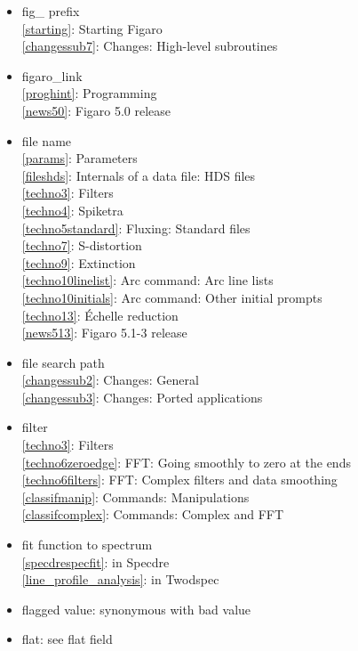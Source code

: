 \documentclass[11pt,twoside]{article}
\newcommand{\htmlref}[2]{#1}
\newcommand{\idxint}[2]{\ref{#1}: \htmlref{#2}{#1}}
\newcommand{\idxint}[2]{\htmlref{#2}{#1}}
\begin{document}
\begin{itemize}
\item fig\_ prefix\\
   \idxint{starting}{Starting Figaro}\\
   \idxint{changessub7}{Changes: High-level subroutines}
\item figaro\_link\\
   \idxint{proghint}{Programming}\\
   \idxint{news50}{Figaro 5.0 release}
\item file name\\
   \idxint{params}{Parameters}\\
   \idxint{fileshds}{Internals of a data file: HDS files}\\
   \idxint{techno3}{Filters}\\
   \idxint{techno4}{Spiketra}\\
   \idxint{techno5standard}{Fluxing: Standard files}\\
   \idxint{techno7}{S-distortion}\\
   \idxint{techno9}{Extinction}\\
   \idxint{techno10linelist}{Arc command: Arc line lists}\\
   \idxint{techno10initials}{Arc command: Other initial prompts}\\
   \idxint{techno13}{\'Echelle reduction}\\
   \idxint{news513}{Figaro 5.1-3 release}
\item file search path\\
   \idxint{changessub2}{Changes: General}\\
   \idxint{changessub3}{Changes: Ported applications}
\item filter\\
   \idxint{techno3}{Filters}\\
   \idxint{techno6zeroedge}{FFT: Going smoothly to zero at the ends}\\
   \idxint{techno6filters}{FFT: Complex filters and data smoo\-thing}\\
   \idxint{classifmanip}{Commands: Manipulations}\\
   \idxint{classifcomplex}{Commands: Complex and FFT}
\item fit function to spectrum\\
   \idxint{specdrespecfit}{in Specdre}\\
   \idxint{line_profile_analysis}{in Twodspec}
\item flagged value: synonymous with bad value
\item flat: see flat field

\end{itemize}
\end{document}
